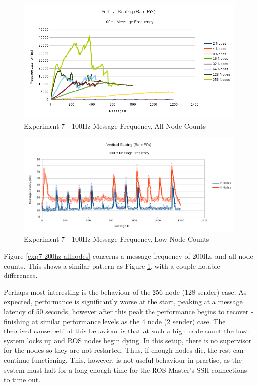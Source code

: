 \documentclass[../dissertation.tex]{subfiles}
\begin{document}
\begin{figure}[H]
\centering
\includegraphics[width=\textwidth]{images/experiment7/vertical_scaling_100hz_all_node_counts.png}
\caption{Experiment 7 - 100Hz Message Frequency, All Node Counts}
\label{exp7-100hz-allnodes}
\end{figure}

\begin{figure}[H]
\centering
\includegraphics[width=\textwidth]{images/experiment7/vertical_scaling_100hz_low_node_counts.png}
\caption{Experiment 7 - 100Hz Message Frequency, Low Node Counts}
\label{exp7-100hz-lownodes}
\end{figure}

Figure \ref{exp7-200hz-allnodes} concerns a message frequency of 200Hz, and all node counts. This shows a similar pattern as Figure \ref{exp7-100hz-allnodes}, with a couple notable differences.

Perhaps most interesting is the behaviour of the 256 node (128 sender) case. As expected, performance is significantly worse at the start, peaking at a message latency of 50 seconds, however after this peak the performance begins to recover - finishing at similar performance levels as the 4 node (2 sender) case. The theorised cause behind this behaviour is that at such a high node count the host system locks up and ROS nodes begin dying. In this setup, there is no supervisor for the nodes so they are not restarted. Thus, if enough nodes die, the rest can continue functioning. This, however, is not useful behaviour in practise, as the system must halt for a long-enough time for the ROS Master's SSH connections to time out.
\end{document}
